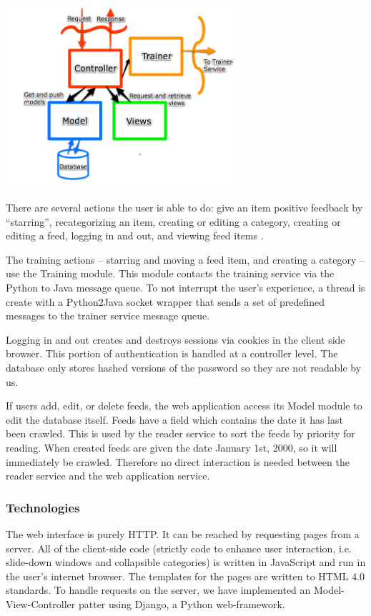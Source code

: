 \documentclass[letterpaper]{article}
\begin{document}
\noindent\includegraphics[width=3.4in]{MVC.png}

There are several actions the user is able to do: give an item positive feedback by ``starring'', recategorizing an item, creating or editing a category, creating or editing a feed, logging in and out, and viewing feed items . 

The training actions -- starring and moving a feed item, and creating a category -- use the Training module. This module contacts the training service via the Python to Java message queue. To not interrupt the user's experience, a thread is create with a Python2Java socket wrapper that sends a set of predefined messages to the trainer service message queue.

Logging in and out creates and destroys sessions via cookies in the client side browser. This portion of authentication is handled at a controller level. The database only stores hashed versions of the password so they are not readable by us.

If users add, edit, or delete feeds, the web application access its Model module to edit the database itself.  Feeds have a field which contains the date it has last been crawled.  This is used by the reader service to sort the feeds by priority for reading.  When created feeds are given the date January 1st, 2000, so it will immediately be crawled.  Therefore no direct interaction is needed between the reader service and the web application service.

\subsubsection{Technologies}
The web interface is purely HTTP.  It can be reached by requesting pages from a server.  All of the client-side code (strictly code to enhance user interaction, i.e. slide-down windows and collapsible categories) is written in JavaScript and run in the user's internet browser. The templates for the pages are written to HTML 4.0 standards. To handle requests on the server, we have implemented an Model-View-Controller patter using Django, a Python web-framework.  
\end{document}

